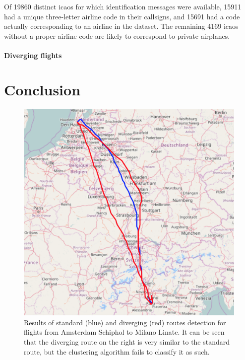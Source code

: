 \documentclass{vldb}
\begin{document}
Of 19860 distinct icaos for which identification messages were available, 15911
had a unique three-letter airline code in their callsigns, and 15691 had a code
actually corresponding to an airline in the dataset. The remaining 4169
icaos without a proper airline code are likely to correspond to private airplanes.

\paragraph{Diverging flights}





\section{Conclusion}

\begin{figure}[t]
  \centering
  \includegraphics[scale=0.35]{imgs/schiphol-linate.png}
  \caption{Results of standard (blue) and diverging (red) routes detection for
    flights from Amsterdam Schiphol to Milano Linate. It can be seen that the
    diverging route on the right is very similar to the standard route, but the
    clustering algorithm fails to classify it as such.}
  \label{fig:schiphol-linate}
\end{figure}
\end{document}
